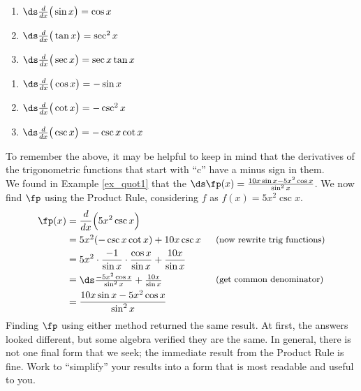 {		\noindent\begin{minipage}[t]{.5\specialboxlength}
		\begin{enumerate}
		\item		$\ds \frac{d}{dx}\big(\sin x\big) = \cos x$\addtocounter{enumi}{1}
		\item		$\ds \frac{d}{dx}\big(\tan x\big) = \sec^2 x$\addtocounter{enumi}{1}
		\item		$\ds \frac{d}{dx}\big(\sec x\big) = \sec x\tan x$\addtocounter{enumi}{1}
		\end{enumerate}
		\end{minipage}
		\noindent\begin{minipage}[t]{.5\specialboxlength}
		\begin{enumerate}\addtocounter{enumi}{1}
		\item		$\ds \frac{d}{dx}\big(\cos x\big) = -\sin x$\addtocounter{enumi}{1}
		\item		$\ds \frac{d}{dx}\big(\cot x\big) = -\csc^2 x$\addtocounter{enumi}{1}
		\item		$\ds \frac{d}{dx}\big(\csc x\big) = -\csc x\cot x$
		\end{enumerate}
		\end{minipage}
}

To remember the above, it may be helpful to keep in mind that the derivatives of the trigonometric functions that start with ``c'' have a minus sign in them.\\

{We found in Example \ref{ex_quot1} that the $\ds \fp(x) = \frac{10x\sin x - 5x^2\cos x}{\sin^2 x}$. We now find $\fp$ using the Product Rule, considering $f$ as $f(x) = 5x^2\csc x$.
		\begin{align*}
		\fp(x) &= \frac{d}{dx}\Big(5x^2\csc x\Big) \\
					&=	\parbox{140pt}{$5x^2(-\csc x\cot x) + 10x\csc x$} \text{\small (now rewrite trig functions)}\\
					&= 5x^2\cdot \frac{-1}{\sin x}\cdot \frac{\cos x}{\sin x} + \frac{10x}{\sin x}\\
					&=	\parbox{140pt}{$\ds\frac{-5x^2\cos x}{\sin ^2x}+\frac{10x}{\sin x}$} \text{\small (get common denominator)}\\
					&= \frac{10x\sin x - 5x^2\cos x}{\sin^2x}
		\end{align*}
Finding $\fp$ using either method returned the same result. At first, the answers looked different, but some algebra verified they are the same. In general, there is not one final form that we seek; the immediate result from the Product Rule is fine. Work to ``simplify'' your results into a form that is most readable and useful to you.
}\\

